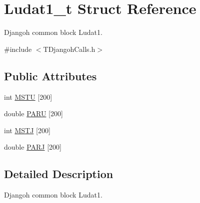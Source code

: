 \hypertarget{struct_ludat1__t}{\section{Ludat1\+\_\+t Struct Reference}
\label{struct_ludat1__t}
}


Djangoh common block Ludat1.  




{\ttfamily \#include $<$T\+Djangoh\+Calls.\+h$>$}

\subsection*{Public Attributes}
\begin{DoxyCompactItemize}
\item 
int \hyperlink{struct_ludat1__t_ae01a3aee4bb22a760e8ea252207e2cd4}{M\+S\+T\+U} \mbox{[}200\mbox{]}
\item 
double \hyperlink{struct_ludat1__t_acde27cfd0ebacc6b76cdcb339044c627}{P\+A\+R\+U} \mbox{[}200\mbox{]}
\item 
int \hyperlink{struct_ludat1__t_ab47d0cbcea897c1d7f6993c63d8fb1d8}{M\+S\+T\+J} \mbox{[}200\mbox{]}
\item 
double \hyperlink{struct_ludat1__t_a3c1647b2c9d49467b84324857e22daaf}{P\+A\+R\+J} \mbox{[}200\mbox{]}
\end{DoxyCompactItemize}


\subsection{Detailed Description}
Djangoh common block Ludat1. 

